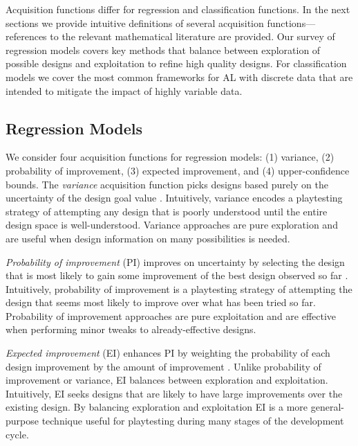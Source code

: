 \documentclass{sig-alternate}
\begin{document}
Acquisition functions differ for regression and classification functions.
In the next sections we provide intuitive definitions of several acquisition functions---references to the relevant mathematical literature are provided.
Our survey of regression models covers key methods that balance between exploration of possible designs and exploitation to refine high quality designs.
For classification models we cover the most common frameworks for AL with discrete data that are intended to mitigate the impact of highly variable data.



\subsection{Regression Models}
We consider four acquisition functions for regression models: (1) variance, (2) probability of improvement, (3) expected improvement, and (4) upper-confidence bounds.
The \textit{variance} acquisition function picks designs based purely on the uncertainty of the design goal value \cite{brochu2010:thesis}.
Intuitively, variance encodes a playtesting strategy of attempting any design that is poorly understood until the entire design space is well-understood.
Variance approaches are pure exploration and are useful when design information on many possibilities is needed.

\textit{Probability of improvement} (PI) improves on uncertainty by selecting the design that is most likely to gain some improvement of the best design observed so far \cite{brochu2010:thesis}. 
Intuitively, probability of improvement is a playtesting strategy of attempting the design that seems most likely to improve over what has been tried so far.
Probability of improvement approaches are pure exploitation and are effective when performing minor tweaks to already-effective designs.

\textit{Expected improvement} (EI) enhances PI by weighting the probability of each design improvement by the amount of improvement \cite{brochu2010:thesis}.
Unlike probability of improvement or variance, EI balances between exploration and exploitation.
Intuitively, EI seeks designs that are likely to have large improvements over the existing design.
By balancing exploration and exploitation EI is a more general-purpose technique useful for playtesting during many stages of the development cycle.
\end{document}
